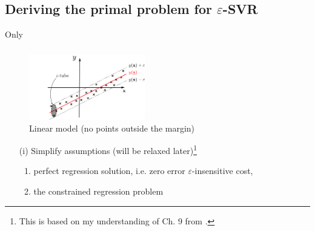 \subsection{Deriving the primal problem for $\varepsilon$-SVR}

\begin{frame}{Only}\frametitle{\subsubsecname}

\begin{figure}[h]
     \centering
	 \includegraphics[width=0.45\textwidth]{img/regression_1d_linear_margin}%
     \caption{Linear model (no points outside the margin)}
	 \label{fig:model_margin}
\end{figure}

\slidesonly{\vspace{-5mm}}

\begin{itemize}
\item[(i)]
Simplify assumptions (will be relaxed later){\footnote{This is based on my understanding of Ch. 9 from \citep{scholkopf2001learning}.}}

\begin{enumerate}
    \item<only@1-> perfect regression solution, i.e. zero error $\varepsilon$-insensitive cost,
    \item<only@2,3> the constrained regression problem\\
\end{enumerate}
\end{itemize}
\end{frame}
